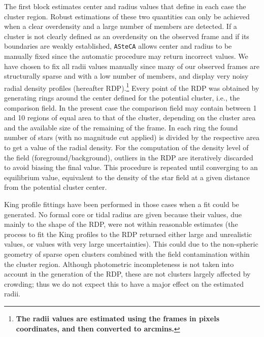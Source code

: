 \documentclass[draft]{aa}
\begin{document}
The first block estimates center and radius values that define in each case the
cluster region. Robust estimations of these two quantities can only be achieved
when a clear overdensity and a large number of members are detected.
If a cluster is not clearly defined as an overdensity on the observed frame and
if its boundaries are weakly established, \texttt{ASteCA} allows center and
radius to be manually fixed since the automatic procedure may return incorrect
values. We have chosen to fix all radii values manually since many of
our observed frames are structurally sparse and with a low number of members,
and display very noisy radial density profiles (hereafter RDP).\footnote{
\textbf{The radii values are estimated using the frames in pixels coordinates,
and then converted to arcmins.}
}
%
Every point of the RDP was obtained by generating rings around the
center defined for the potential cluster, i.e., the comparison field.
In the present case the comparison field may contain between 1 and 10 regions
of equal area to that of the cluster, depending on the cluster area and the
available size of the remaining of the frame. In each ring the found number of
stars (with no magnitude cut applied) is divided by the respective
area to get a value of the radial density.
For the computation of the density level of the field (foreground/background),
outliers in the RDP are iteratively discarded to avoid biasing the final value.
This procedure is repeated until converging to an equilibrium value, equivalent
to the density of the star field at a given distance from the potential
cluster center.

King profile \citep{King_1962} fittings have been performed in those cases when
a fit could be generated. No formal core or tidal radius are given because
their values, due mainly to the shape of the RDP, were not within reasonable
estimates (the process to fit the King profiles to the RDP returned either
large and unrealistic values, or values with very large uncertainties).
This could due to the non-spheric geometry of sparse open clusters
combined with the field contamination within the cluster region. Although
photometric incompleteness is not taken into account in the generation of the
RDP, these are not clusters largely affected by crowding; thus we do not
expect this to have a major effect on the estimated radii.\\
\end{document}
